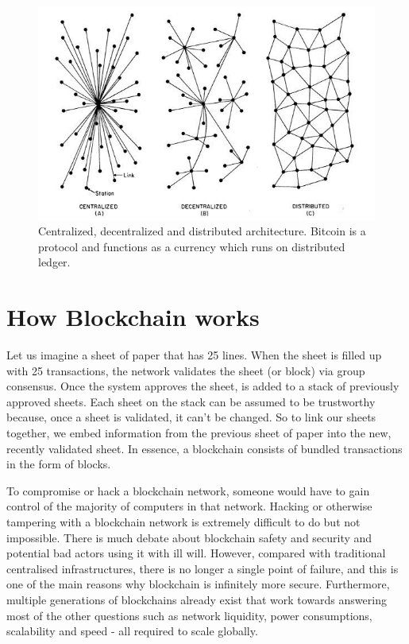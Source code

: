 \begin{figure}
    \centering
    \includegraphics[width=.8\textwidth]{img/ch-exchanges/centralizedvsdecentralized.jpg}
    \caption[Centralized, decentralized and distributed architecture.]{Centralized, decentralized and distributed architecture. Bitcoin is a protocol and functions as a currency which runs on distributed ledger. \cite{lastamericanvagabond}}
    \label{fig:centralized_decentralized_distributed}

\end{figure}

\section{How Blockchain works}
Let us imagine a sheet of paper that has 25 lines. When the sheet is filled up with 25 transactions, the network validates the sheet (or block) via group consensus. Once the system approves the sheet, is added to a stack of previously approved sheets. Each sheet on the stack can be assumed to be trustworthy because, once a sheet is validated, it can't be changed. So to link our sheets together, we embed information from the previous sheet of paper into the new, recently validated sheet. In essence, a blockchain consists of bundled transactions in the form of blocks. \cite{course:blockchain_usecases}


To compromise or hack a blockchain network, someone would have to gain control of the majority of computers in that network. Hacking or otherwise tampering with a blockchain network is extremely difficult to do but not impossible. There is much debate about blockchain safety and security and potential bad actors using it with ill will. However, compared with traditional centralised infrastructures, there is no longer a single point of failure, and this is one of the main reasons why blockchain is infinitely more secure. Furthermore, multiple generations of blockchains already exist that work towards answering most of the other questions such as network liquidity, power consumptions, scalability and speed - all required to scale globally.\medskip 


